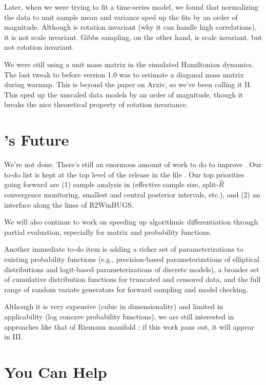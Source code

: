 Later, when we were trying to fit a time-series model, we found that
normalizing the data to unit sample mean and variance sped up the fits
by an order of magnitude.  Although \HMC is rotation invariant (why it
can handle high correlations), it is not scale invariant.  Gibbs
sampling, on the other hand, is scale invariant, but not rotation
invariant.  

We were still using a unit mass matrix in the simulated Hamiltonian
dynamics.  The last tweak to \Stan before version 1.0 was to estimate
a diagonal mass matrix during warmup.  This is beyond the \NUTS paper
on Arxiv, so we've been calling it \NUTS II.  This sped up the
unscaled data models by an order of magnitude, though it breaks the
nice theoretical property of rotation invariance.

\section*{\Stan's Future}

We're not done. There's still an enormous amount of work to do to
improve \Stan.  Our to-do list is kept at the top level of the release
in the file .  Our top priorities going forward are
(1) sample analysis in \Cpp (effective sample size, split-$\hat{R}$
convergence monitoring, smallest and central posterior intervals,
etc.), and (2) an \R interface along the lines of {\small R2WinBUGS}.

We will also continue to work on speeding up algorithmic
differentiation through partial evaluation, especially for matrix and
probability functions.  

Another immediate to-do item is adding a richer set of
parameterizations to existing probability functions (e.g.,
precision-based parameterizations of elliptical distributions and
logit-based parameterizations of discrete models), a broader set of
cumulative distribution functions for truncated and censored data, and
the full range of random variate generators for forward sampling and
model checking.  

Although it is very expensive (cubic in dimensionality) and limited in
applicability (log concave probability functions), we are still
interested in approaches like that of Riemann manifold \HMC
\cite{GirolamiCalderhead:2011}; if this work pans out, it will appear
in \NUTS III.

\section*{You Can Help}

